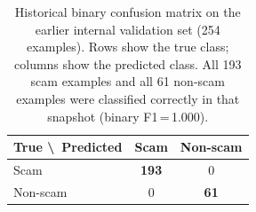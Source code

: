 \begin{table}[H]
\centering
\setlength{\tabcolsep}{12pt}
\renewcommand{\arraystretch}{1.3}
\begin{tabular}{lcc}
\toprule
\textbf{True \textbackslash\ Predicted} & \textbf{Scam} & \textbf{Non-scam} \\
\midrule
Scam     & \cellcolor{CVBLUE!15}\textbf{193} & 0 \\
Non-scam & 0 & \cellcolor{CVBLUE!15}\textbf{61} \\
\bottomrule
\end{tabular}
\caption{Historical binary confusion matrix on the earlier internal validation set (254 examples). Rows show the true class; columns show the predicted class. All 193 scam examples and all 61 non-scam examples were classified correctly in that snapshot (binary F1\,=\,1.000).}
\label{tab:binary-confusion-matrix}
\end{table}
